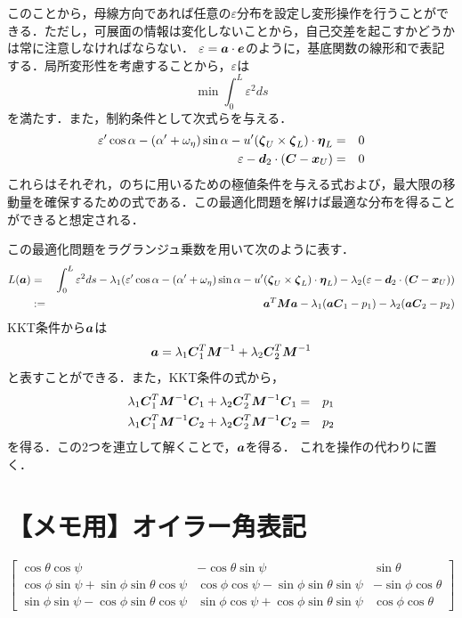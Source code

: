 \documentclass[16.7pt]{jsarticle}
\begin{document}
		このことから，母線方向であれば任意の$ \varepsilon $分布を設定し変形操作を行うことができる．ただし，可展面の情報は変化しないことから，自己交差を起こすかどうかは常に注意しなければならない．
		$ \varepsilon = \boldsymbol{a} \cdot \boldsymbol{e}$のように，基底関数の線形和で表記する．局所変形性を考慮することから，$ \varepsilon $は
		\begin{equation}\label{eq:min_vareps}
			\min \int_{0}^{L} \varepsilon^2 ds
		\end{equation}
		を満たす．また，制約条件として次式らを与える．
		\begin{eqnarray}
			\varepsilon' \cos \alpha -(\alpha'+\omega_{\eta})\sin \alpha - u' (\boldsymbol{\zeta}_U \times \boldsymbol{\zeta}_L) \cdot \boldsymbol{\eta}_L &=& 0 \\
			\varepsilon - \boldsymbol{d}_2 \cdot (\boldsymbol{C} - \boldsymbol{x}_U) &=& 0
		\end{eqnarray}
		これらはそれぞれ，のちに用いるための極値条件を与える式および，最大限の移動量を確保するための式である．この最適化問題を解けば最適な分布を得ることができると想定される．
		
		この最適化問題をラグランジュ乗数を用いて次のように表す．
		\begin{eqnarray}\label{eq:LagrangeEq}
			L(\boldsymbol{a}) &=&  \int_{0}^{L} \varepsilon^2 ds - \lambda_1(\varepsilon' \cos \alpha -(\alpha'+\omega_{\eta})\sin \alpha - u' (\boldsymbol{\zeta}_U \times \boldsymbol{\zeta}_L) \cdot \boldsymbol{\eta}_L) - \lambda_2 (\varepsilon - \boldsymbol{d}_2 \cdot (\boldsymbol{C} - \boldsymbol{x}_U)) \\
			&:= & \boldsymbol{a}^T \boldsymbol{M} \boldsymbol{a} - \lambda_1(\boldsymbol{a} \boldsymbol{C}_1 - p_1) -\lambda_2(\boldsymbol{a} \boldsymbol{C}_2 - p_2) 
		\end{eqnarray}
		KKT条件から$ \boldsymbol{a} $は
		\begin{equation}\label{eq:Calc_Coef}
			\boldsymbol{a} = \lambda_1 \boldsymbol{C}_1^T \boldsymbol{M}^{-1} + \lambda_2 \boldsymbol{C}_2^T \boldsymbol{M}^{-1} 
		\end{equation}
		と表すことができる．また，KKT条件の式から，
		\begin{eqnarray}
			\lambda_1 \boldsymbol{C}_1^T \boldsymbol{M}^{-1} \boldsymbol{C}_1 + \lambda_2 \boldsymbol{C}_2^T \boldsymbol{M}^{-1} \boldsymbol{C}_1  &=& p_1 \\
			\lambda_1 \boldsymbol{C}_1^T \boldsymbol{M}^{-1} \boldsymbol{C}_2 + \lambda_2 \boldsymbol{C}_2^T \boldsymbol{M}^{-1} \boldsymbol{C}_2 &=& p_2
		\end{eqnarray}
		を得る．この2つを連立して解くことで，$ \boldsymbol{a} $を得る．
		これを操作の代わりに置く．
	\section{【メモ用】オイラー角表記}
	\begin{equation}
		\left[ \begin{array}{ccc}
			\cos \theta \cos \psi & -\cos \theta \sin \psi & \sin \theta \\
			\cos \phi \sin \psi + \sin \phi \sin \theta \cos \psi & \cos \phi \cos \psi - \sin \phi \sin \theta \sin \psi & -\sin \phi \cos \theta \\
			\sin \phi \sin \psi - \cos \phi \sin \theta \cos \psi & \sin \phi \cos \psi + \cos \phi \sin \theta \sin \psi & \cos \phi \cos \theta
		\end{array}\right]
	\end{equation}	
		
\end{document}
